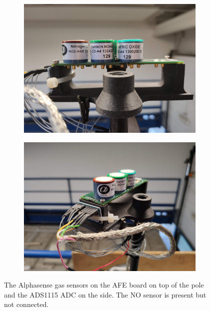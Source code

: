 \begin{figure}[h!]
    \centering
    \begin{subfigure}[b]{0.45\textwidth}
        \centering
        \includegraphics[width=\textwidth]{images/drone/IMG_20211105_104008.jpg}
        \caption{}
        \label{fig:gas-sensors1}
    \end{subfigure}
    \hfill
    \begin{subfigure}[b]{0.45\textwidth}
        \centering
        \includegraphics[width=\textwidth]{images/drone/IMG_20211105_104040.jpg}
        \caption{}
        \label{fig:gas-sensors2}
    \end{subfigure}
       \caption{The Alphasense gas sensors on the AFE board on top of the pole and the ADS1115 ADC on the side. The NO sensor is present but not connected.}
       \label{fig:gas-sensors}
\end{figure}
\clearpage


